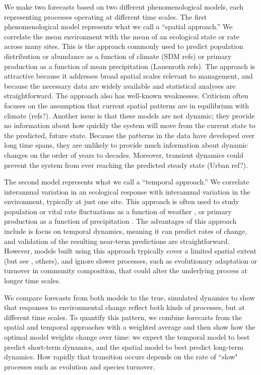 \documentclass[11pt]{article}
\begin{document}
We make two forecasts based on two different phenomenological models, each representing processes operating at different time scales. 
The first phenomenological model represents what we call a ``spatial approach.'' We correlate the mean environment with the mean of an ecological state or rate 
 across many sites. This is the approach commonly used to predict population distribution or abundance as a function of climate (SDM refs) or
 primary production as a function of mean precipitation (Lauenroth refs). The approach is attractive because it addresses broad spatial scales relevant to 
 management, and because the necessary data are widely available and statistical analyses are straightforward. The approach also has well-known weaknesses.
Criticism often focuses on the assumption that current spatial patterns are in equilibrium with climate (refs?). Another issue is that these models are not dynamic; 
they provide no information about how quickly the system will move from the current state to the predicted, future state. Because the patterns in the data have developed 
over long time spans, they are unlikely to provide much information about dynamic changes on the order of years to decades. Moreover, transient dynamics could 
prevent the system from ever reaching the predicted steady state (Urban ref?). 

The second model represents what we call a ``temporal approach.'' We correlate interannual variation in an ecological response with interannual variation in the environment, 
typically at just one site. This approach is often used to study population or vital rate fluctuations as a function of weather \citep{dalgleish_climate_2011}, 
or primary production as a function of precipitation \citep{lauenroth_long-term_1992}. The advantages of this approach include is focus on temporal dynamics, meaning it 
can predict rates of change, and validation of the resulting near-term predictions are straightforward. However, models built using this approach typically cover 
a limited spatial extent (but see \cite{kleinhesselink_response_2018}, others), and ignore slower processes, such as evolutionary adaptation or turnover in community composition, 
that could alter the underlying process at longer time scales.

We compare forecasts from both models to the true, simulated dynamics to show that responses to environmental change reflect both kinds of processes, but at different time scales. To quantify this pattern, we combine forecasts from the spatial and temporal approaches with a weighted average and then show how the optimal model weights change over time: we expect the temporal model to best predict short-term dynamics, and the spatial model to best predict long-term dynamics. How rapidly that transition occurs depends on the rate of  ``slow" processes such as evolution and species turnover. 
\end{document}
